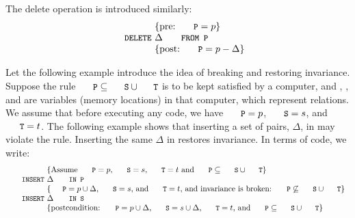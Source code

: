 \documentclass{svproc}
\begin{document}
	The delete operation is introduced similarly:
\[\begin{array}{r@{~}l}
&\{\text{pre: }\code{P}=p\}\\
\code{DELETE}&\Delta\code{ FROM P}\\
&\{\text{post: }\code{P}=p-\Delta\}\\
\end{array}\]
	
	Let the following example introduce the idea of breaking and restoring invariance.
	Suppose the rule $\code{P}\subs\code{S}\cup\code{T}$ is to be kept satisfied by a computer,
	and , , and  are variables (memory locations) in that computer,
	which represent relations.
	We assume that before executing any code, we have $\code{P}=p$, $\code{S}=s$, and $\code{T}=t$.
	The following example shows that inserting a set of pairs, $\Delta$, in 
	may violate the rule.
	Inserting the same $\Delta$ in  restores invariance.
	In terms of code, we write:
\[\begin{array}{r@{~}l}
&\{\text{Assume $\code{P}=p$, $\code{S}=s$, $\code{T}=t$ and $\code{P}\subs\code{S}\cup\code{T}$}\}\\
\code{INSERT}&\Delta\code{ IN P}\\
&\{\text{$\code{P}=p\cup\Delta$, $\code{S}=s$, and $\code{T}=t$, and invariance is broken: $\code{P}\not\subs\code{S}\cup\code{T}$}\}\\
\code{INSERT}&\Delta\code{ IN S}\\
&\{\text{postcondition: $\code{P}=p\cup\Delta$, $\code{S}=s\cup\Delta$, $\code{T}=t$, and $\code{P}\subs\code{S}\cup\code{T}$}\}\\
\end{array}\]
	
\end{document}
